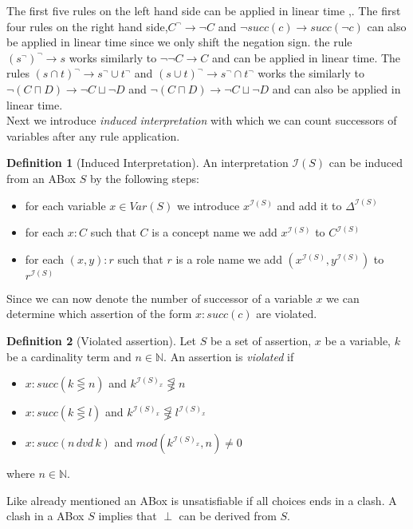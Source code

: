 \documentclass[a4paper,11pt]{scrartcl}
\theoremstyle{break}
\theoremstyle{definition}
\newtheorem{mydef}{Definition}
\begin{document}
The first five rules on the left hand side can be applied in linear time \cite{1},\cite{6}. The first four rules on the right hand side,$C^\neg\rightarrow \neg C$ and $\neg succ(c)\rightarrow succ(\neg c)$ can also be applied in linear time since we only shift the negation sign. the rule $(s^\neg)^\neg\rightarrow s$ works similarly to $\neg\neg C\rightarrow C$ and can be applied in linear time. The rules $(s\cap t)^\neg\rightarrow s^\neg\cup t^\neg$ and $(s\cup t)^\neg\rightarrow s^\neg \cap t^\neg$ works the similarly to $\neg(C\sqcap D)\rightarrow \neg C\sqcup \neg D$ and $\neg(C\sqcap D)\rightarrow \neg C\sqcup \neg D$ and can also be applied in linear time.\\
Next we introduce \textit{induced interpretation} with which we can count successors of variables after any rule application.
\begin{mydef}[Induced Interpretation]
An interpretation $\mathcal{I}(S)$ can be induced from an ABox $S$ by the following steps:
\begin{itemize}
\item for each variable $x\in Var(S)$ we introduce $x^{\mathcal{I}(S)}$ and add it to $\Delta^{\mathcal{I}(S)}$
\item for each $x:C$ such that $C$ is a concept name we add $x^{\mathcal{I}(S)}$ to $C^{\mathcal{I}(S)}$
\item for each $(x,y):r$ such that $r$ is a role name we add $(x^{\mathcal{I}(S)},y^{\mathcal{I}(S)})$ to $r^{\mathcal{I}(S)}$
\end{itemize}
\end{mydef}
Since we can now denote the number of successor of a variable $x$ we can determine which assertion of the form $x:succ(c)$ are violated.
\begin{mydef}[Violated assertion]
Let $S$ be a set of assertion, $x$ be a variable, $k$ be a cardinality term and $n\in\mathbb{N}$. An assertion is \textit{violated} if
\begin{itemize}
\item $x:succ(k\lesseqgtr n)$ and $k^{\mathcal{I}(S)_x}\not\lesseqgtr n$
\item $x:succ(k\lesseqgtr l)$ and $k^{\mathcal{I}(S)_x}\not\lesseqgtr l^{\mathcal{I}(S)_x}$
\item $x:succ(n\,dvd\,k)$ and $mod(k^{\mathcal{I}(S)_x},n)\neq 0$
\end{itemize} 
where $n\in\mathbb{N}$.
\end{mydef}
Like already mentioned an ABox is unsatisfiable if all choices ends in a clash. A clash in a ABox $S$ implies that $\perp$ can be derived from $S$.
\end{document}
